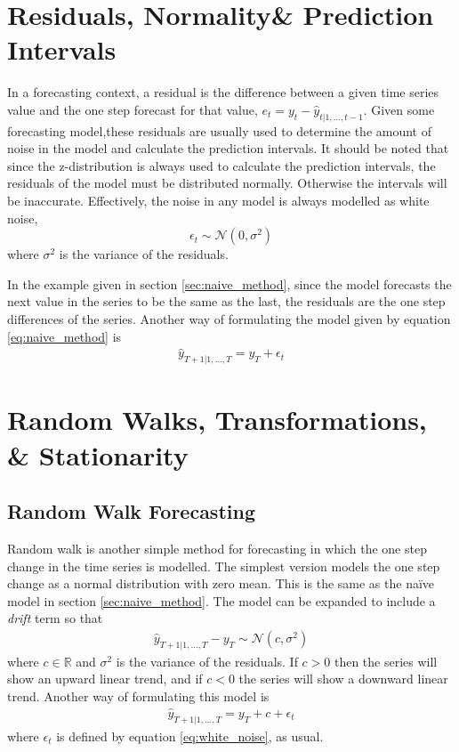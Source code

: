 \documentclass[a4paper,12pt]{article}
\theoremstyle{definition}
\begin{document}
\section{Residuals, Normality\& Prediction Intervals}
In a forecasting context, a residual is the difference between a given time series value and the one step forecast for that value, $e_t = y_t - \hat{y}_{t | 1, \dots , t-1}$. Given some forecasting model,these residuals are usually used to determine the amount of noise in the model and calculate the prediction intervals. It should be noted that since the z-distribution is always used to calculate the prediction intervals, the residuals of the model must be distributed normally. Otherwise the intervals will be inaccurate. Effectively, the noise in any model is always modelled as white noise,
\begin{equation}\label{eq:white_noise}
	\epsilon_t \sim \mathcal{N}(0, \sigma^2)
\end{equation}
where $\sigma^2$ is the variance of the residuals.

In the example given in section \ref{sec:naive_method}, since the model forecasts the next value in the series to be the same as the last, the residuals are the one step differences of the series. Another way of formulating the model given by equation \ref{eq:naive_method} is
\begin{align}
	\hat{y}_{T+1 | 1, \dots, T} = y_T + \epsilon_t
\end{align}

\section{Random Walks, Transformations, \& Stationarity}

\subsection{Random Walk Forecasting}

Random walk is another simple method for forecasting in which the one step change in the time series is modelled. The simplest version models the one step change as a normal distribution with zero mean. This is the same as the na\"{i}ve model in section \ref{sec:naive_method}. The model can be expanded to include a \textit{drift} term so that
\begin{align}
	\hat{y}_{T+1|1, \dots, T} - y_T \sim \mathcal{N}(c, \sigma^2)
\end{align}
where $c \in \mathbb{R}$ and $\sigma^2$ is the variance of the residuals. If $c > 0$ then  the series will show an upward linear trend, and if $c<0$ the series will show a downward linear trend. Another way of formulating this model is
\begin{align}
	\hat{y}_{T+1|1, \dots, T} = y_T + c + \epsilon_t
\end{align}
where $\epsilon_t$ is defined by equation \ref{eq:white_noise}, as usual.
\end{document}
